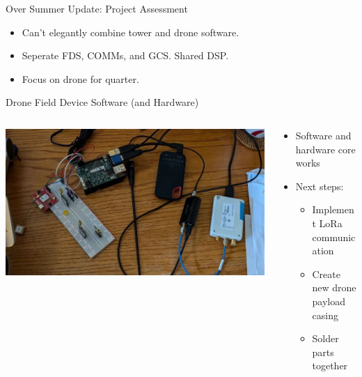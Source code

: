 \begin{frame}{Over Summer Update: Project Assessment}
    \begin{itemize}
        \item Can't elegantly combine tower and drone software.
        \item Seperate FDS, COMMs, and GCS. Shared DSP.
        \item Focus on drone for quarter.
    \end{itemize}
\end{frame}

\begin{frame}{Drone Field Device Software (and Hardware)}
    \begin{columns}
        \begin{column}{0.5\textwidth}
            \includegraphics[height=0.7\textheight,width=\textwidth,keepaspectratio]{images/rtt/Screenshot 2024-09-27 165936.jpg}
        \end{column}
        \begin{column}{0.5\textwidth}
            \begin{itemize}
                \item Software and hardware core works
                \item Next steps:
                \begin{itemize}
                    \item Implement LoRa communication
                    \item Create new drone payload casing
                    \item Solder parts together
                \end{itemize}
            \end{itemize}
        \end{column}
    \end{columns}
\end{frame}

